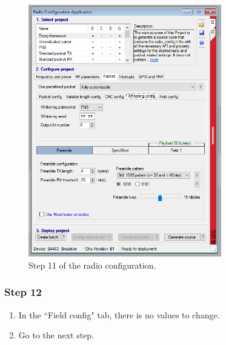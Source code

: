 \begin{figure}[!h]
	\begin{center}
		\includegraphics[width=0.75\textwidth]{figures/wds-tutorial/wds-tutorial-11.png}
		\caption{Step 11 of the radio configuration.}
		\label{fig:wds-tutorial-step-11}
	\end{center}
\end{figure}

\subsubsection{Step 12}

\begin{enumerate}
    \item In the ``Field config" tab, there is no values to change.
    \item Go to the next step.
\end{enumerate}

